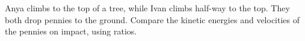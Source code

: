         Anya climbs to the top of a tree, while Ivan climbs half-way to the top. They both
        drop pennies to the ground. Compare the kinetic energies and velocities of the
        pennies on impact, using ratios.
